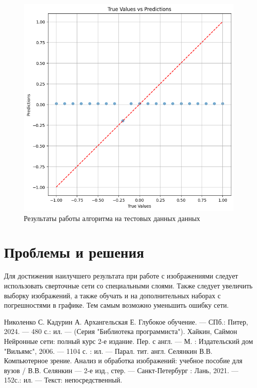 \documentclass[12pt, a4paper]{article}
\begin{document}
	\begin{figure}[!h]
		\centering
		\includegraphics[width=1\linewidth]{train_output}
		\caption{Результаты работы алгоритма на тестовых данных данных}
		\label{test}
	\end{figure}

	
	\section{Проблемы и решения}
	Для достижения наилучшего результата при работе с изображениями следует использовать сверточные сети со специальными слоями. Также следует увеличить выборку изображений, а также обучать и на дополнительных наборах с погрешностями в графике. Тем самым возможно уменьшить ошибку сети.
		
	\newpage
	\begin{thebibliography}{10}
	 Николенко С. Кадурин А. Архангельская Е. Глубокое обучение. --- СПб.: Питер, 2024. --- 480 с.: ил. --- (Серия "Библиотека программиста").
	 Хайкин, Саймон Нейронные сети: полный курс 2-е издание. Пер. с англ. --- М. : Издательский дом "Вильямс", 2006. --- 1104 с. : ил. --- Парал. тит. англ.
	 Селянкин В.В. Компьютерное зрение. Анализ и обработка изображений: учебное пособие для вузов / В.В. Селянкин --- 2-е изд., стер. --- Санкт-Петербург : Лань, 2021. --- 152с.: ил. --- Текст: непосредственный.
	\end{thebibliography}
\end{document}
